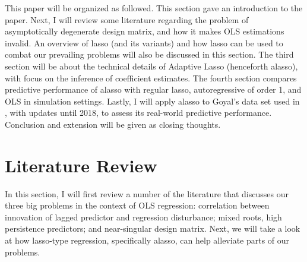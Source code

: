\documentclass[12pt,a4paper]{article}
\begin{document}
This paper will be organized as followed. This section gave an introduction to the paper. Next, I will review some literature regarding the problem of asymptotically degenerate design matrix, and how it makes OLS estimations invalid. An overview of lasso (and its variants) and how lasso can be used to combat our prevailing problems will also be discussed in this section. The third section will be about the technical details of Adaptive Lasso (henceforth alasso), with focus on the inference of coefficient estimates. The fourth section compares predictive performance of alasso with regular lasso, autoregressive of order 1, and OLS in simulation settings. Lastly, I will apply alasso to Goyal's data set used in \cite{welch2008comprehensive}, with updates until 2018, to assess its real-world predictive performance. Conclusion and extension will be given as closing thoughts.


\section{Literature Review}
In this section, I will first review a number of the literature that discusses our three big problems in the context of OLS regression: correlation between innovation of lagged predictor and regression disturbance; mixed roots, high persistence predictors; and near-singular design matrix. Next, we will take a look at how lasso-type regression, specifically alasso, can help alleviate parts of our problems.
\end{document}
